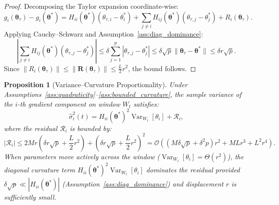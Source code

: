 \documentclass[sn-mathphys,Numbered]{sn-jnl}
\theoremstyle{thmstyleone}
\newtheorem{proposition}{Proposition}
\theoremstyle{thmstyletwo}
\theoremstyle{thmstylethree}
\begin{document}
\begin{proof}
Decomposing the Taylor expansion coordinate-wise:
\begin{equation}
g_i(\boldsymbol{\theta}_\tau) - g_i(\boldsymbol{\theta}^*) = H_{ii}(\boldsymbol{\theta}^*)(\theta_{\tau,i} - \theta_i^*) + \sum_{j \ne i} H_{ij}(\boldsymbol{\theta}^*)(\theta_{\tau,j} - \theta_j^*) + R_i(\boldsymbol{\theta}_\tau).
\end{equation}
Applying Cauchy--Schwarz and Assumption~\ref{ass:diag_dominance}:
\begin{equation}
\left| \sum_{j \ne i} H_{ij}(\boldsymbol{\theta}^*)(\theta_{\tau,j} - \theta_j^*) \right| \le \delta \sum_{j=1}^p |\theta_{\tau,j} - \theta_j^*| \le \delta \sqrt{p} \|\boldsymbol{\theta}_\tau - \boldsymbol{\theta}^*\| \le \delta r \sqrt{p}.
\end{equation}
Since $\|R_i(\boldsymbol{\theta}_\tau)\| \le \|\mathbf{R}(\boldsymbol{\theta}_\tau)\| \le \frac{L}{2} r^2$, the bound follows.
\end{proof}

\begin{proposition}[Variance--Curvature Proportionality]
\label{prop:variance_curvature}
Under Assumptions~\ref{ass:quadraticity}--\ref{ass:bounded_curvature}, the sample variance of the $i$-th gradient component on window $W_t$ satisfies:
\begin{equation}
\hat{\sigma}_i^2(t) = H_{ii}(\boldsymbol{\theta}^*)^2 \operatorname{Var}_{W_t}[\theta_i] + \mathcal{R}_i,
\end{equation}
where the residual $\mathcal{R}_i$ is bounded by:
\begin{equation}
|\mathcal{R}_i| \le 2 M r \left( \delta r \sqrt{p} + \frac{L}{2} r^2 \right) + \left( \delta r \sqrt{p} + \frac{L}{2} r^2 \right)^2 = \mathcal{O}\left( (M \delta \sqrt{p} + \delta^2 p) r^2 + M L r^3 + L^2 r^4 \right).
\label{eq:prop1_remainder}
\end{equation}
When parameters move actively across the window ($\operatorname{Var}_{W_t}[\theta_i] = \Theta(r^2)$), the diagonal curvature term $H_{ii}(\boldsymbol{\theta}^*)^2 \operatorname{Var}_{W_t}[\theta_i]$ dominates the residual provided $\delta \sqrt{p} \ll |H_{ii}(\boldsymbol{\theta}^*)|$ (Assumption~\ref{ass:diag_dominance}) and displacement $r$ is sufficiently small.
\end{proposition}
\end{document}
